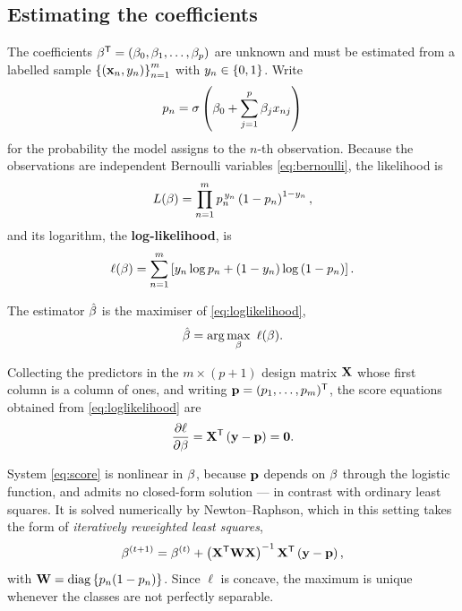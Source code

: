 \subsection{Estimating the coefficients}
\label{subsec:logistic_estimation}

The coefficients $\beta^{\mathsf{T}}=(\beta_0,\beta_1,\dots,\beta_p)$ are unknown and must be
estimated from a labelled sample $\left\{ (\mathbf{x}_n,y_n) \right\}_{n=1}^{m}$ with
$y_n\in\left\{ 0,1 \right\}$. Write
\begin{equation}
  \label{eq:pn}
  p_n=\sigma\left( \beta_0+\sum_{j=1}^{p}\beta_j x_{nj} \right)
\end{equation}
for the probability the model assigns to the $n$-th observation. Because the
observations are independent Bernoulli variables \eqref{eq:bernoulli}, the
likelihood is
\begin{equation}
  \label{eq:likelihood}
  L(\beta)=\prod_{n=1}^{m}p_n^{\,y_n}\left( 1-p_n \right)^{1-y_n},
\end{equation}
and its logarithm, the \textbf{log-likelihood}, is
\begin{equation}
  \label{eq:loglikelihood}
  \ell(\beta)=\sum_{n=1}^{m}
    \left[ y_n\log p_n+(1-y_n)\log\left( 1-p_n \right) \right] .
\end{equation}

\begin{definition}
  \label{def:mle_logistic}
  The estimator $\hat{\beta}$ is the maximiser of \eqref{eq:loglikelihood},
  \begin{equation}
    \label{eq:mle_logistic}
    \hat{\beta}=\arg\max_{\beta}\ \ell(\beta).
  \end{equation}
\end{definition}

Collecting the predictors in the $m\times(p+1)$ design matrix $\mathbf{X}$ whose
first column is a column of ones, and writing $\mathbf{p}=(p_1,\dots,p_m)^{\mathsf{T}}$, the
score equations obtained from \eqref{eq:loglikelihood} are
\begin{equation}
  \label{eq:score}
  \frac{\partial \ell}{\partial \beta}=\mathbf{X}^{\mathsf{T}}\left( \mathbf{y}-\mathbf{p} \right)=\mathbf{0}.
\end{equation}

\begin{remark}
  System \eqref{eq:score} is nonlinear in $\beta$, because $\mathbf{p}$ depends on
  $\beta$ through the logistic function, and admits no closed-form solution ---
  in contrast with ordinary least squares. It is solved numerically by
  Newton--Raphson, which in this setting takes the form of
  \emph{iteratively reweighted least squares},
  \begin{equation}
    \label{eq:irls}
    \beta^{(t+1)}=\beta^{(t)}
      +\left( \mathbf{X}^{\mathsf{T}}\mathbf{W}\mathbf{X} \right)^{-1}\mathbf{X}^{\mathsf{T}}\left( \mathbf{y}-\mathbf{p} \right),
  \end{equation}
  with $\mathbf{W}=\operatorname{diag}\left\{ p_n(1-p_n) \right\}$. Since $\ell$ is concave, the maximum is
  unique whenever the classes are not perfectly separable.
\end{remark}

